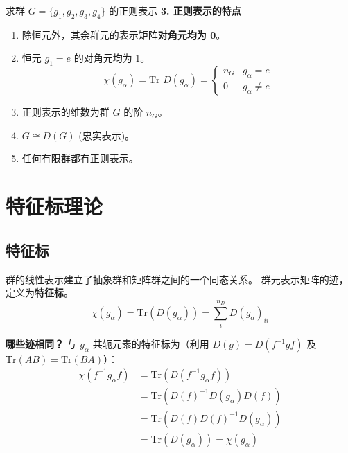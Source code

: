 \begin{example}{求群 $G=\{g_1, g_2, g_3, g_4\}$ 的正则表示}
    \textbf{3. 正则表示的特点}
    \begin{enumerate}
        \item 除恒元外，其余群元的表示矩阵\textbf{对角元均为 0}。
        \item 恒元 $g_1=e$ 的对角元均为 1。
        \begin{equation}
            \chi(g_\alpha) = \text{Tr } D(g_\alpha) = \begin{cases} n_G & g_\alpha = e \\ 0 & g_\alpha \neq e \end{cases}
        \end{equation}
        \item 正则表示的维数为群 $G$ 的阶 $n_G$。
        \item $G \cong D(G)$ (忠实表示)。
        \item 任何有限群都有正则表示。
    \end{enumerate}
\end{example}

\section{特征标理论}

\subsection{特征标}
群的线性表示建立了抽象群和矩阵群之间的一个同态关系。
群元表示矩阵的迹，定义为\textbf{特征标}。
\begin{equation}
    \chi(g_\alpha) = \text{Tr}(D(g_\alpha)) = \sum_i^{n_D} D(g_\alpha)_{ii}
\end{equation}

\textbf{哪些迹相同？}
与 $g_\alpha$ 共轭元素的特征标为（利用 $D(g) = D(f^{-1} g f)$ 及 $\text{Tr}(AB) = \text{Tr}(BA)$）：
\begin{equation}
    \begin{aligned}
        \chi(f^{-1} g_\alpha f) &= \text{Tr}(D(f^{-1} g_\alpha f)) \\
        &= \text{Tr}(D(f)^{-1} D(g_\alpha) D(f)) \\
        &= \text{Tr}(D(f) D(f)^{-1} D(g_\alpha)) \\
        &= \text{Tr}(D(g_\alpha)) = \chi(g_\alpha)
    \end{aligned}
\end{equation}

